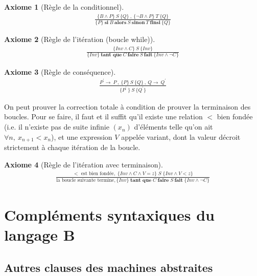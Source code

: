 \documentclass[10pt,a4paper]{article}
\newtheorem{axiom}{Axiome}[section]
\begin{document}
\begin{axiom}[Règle de la conditionnel]
\begin{align}
\frac { \{B \wedge P\}\ S\ \{Q\}\ ,\ \{\neg B \wedge P \}\ T\ \{Q\} } { \{P\}\ \textbf{si}\ B\ \textbf{alors}\ S\ \textbf{sinon}\ T\ \textbf{finsi}\ \{Q\} }
\end{align}
\end{axiom}

\begin{axiom}[Règle de l'itération (boucle while)]
\begin{align}
\frac { \{Inv \wedge C \}\ S\ \{Inv \} } { \{Inv \}\ \textbf{tant que}\ C\ \textbf{faire}\ S\ \textbf{fait}\ \{Inv \wedge \neg C \} }
\end{align}
\end{axiom}

\begin{axiom}[Règle de conséquence]
\begin{align}
\frac { P^\prime \rightarrow\ P\ ,\ \lbrace P \rbrace\ S\ \lbrace Q \rbrace\ ,\ Q \rightarrow\ Q^\prime } { \lbrace P^\prime\ \rbrace\ S\ \lbrace Q^\prime\rbrace }
\end{align}
\end{axiom}

On peut prouver la correction totale à condition de prouver la terminaison des boucles.
Pour se faire, il faut et il suffit qu'il existe une relation $<$ bien fondée (i.e. il n'existe pas de suite infinie $(x_n)$ d'éléments telle qu'on ait $\forall n, \ x_{n+1} < x_n$), et une expression $V$ appelée variant, dont la valeur décroit strictement à chaque itération de la boucle.

\begin{axiom}[Règle de l'itération avec terminaison]
\begin{align}
\frac{< \textrm{\ est\ bien fondée},\;\{Inv \land C \land V=z \}\;S\;\{Inv \land V < z\}} {\textrm{la boucle suivante termine}, \{Inv\}\;\textbf{tant que}\;C\; \textbf{faire}\; S \ \textbf{fait} \;\{Inv \land \lnot C \} }
\end{align}
\end{axiom}


\section{Compléments syntaxiques du langage B}
\label{ComplementSyntaxique}
\subsection{Autres clauses des machines abstraites}
\end{document}
